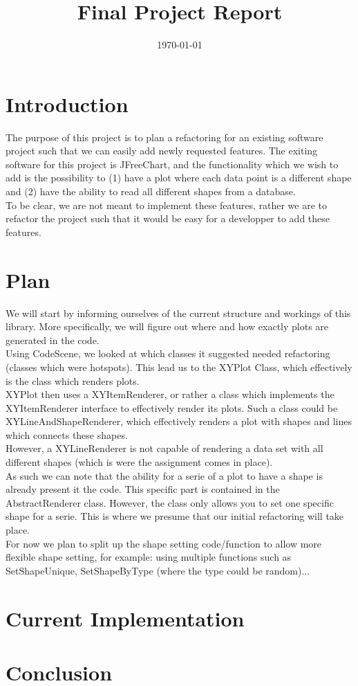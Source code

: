 \documentclass{article}
\title{\textmd{\textbf{Final Project Report}}\\\normalsize\vspace{0.1in}\Large{\projectnaam}}
\author{\student}\date{\today}
\begin{document}
\maketitle
\newpage

\section{Introduction}

The purpose of this project is to plan a refactoring for an existing software project such that we can easily add newly requested features.
The exiting software for this project is JFreeChart, and the functionality which we wish to add is the possibility to (1) have a plot where each data point is a different shape and (2) have the ability to read all different shapes from a database.\\

To be clear, we are not meant to implement these features, rather we are to refactor the project such that it would be easy for a developper to add these features.

\section{Plan}

We will start by informing ourselves of the current structure and workings of this library. More specifically, we will figure out where and how exactly plots are generated in the code.\\

Using CodeScene, we looked at which classes it suggested needed refactoring (classes which were hotspots). This lead us to the XYPlot Class, which effectively is the class which renders plots.\\

XYPlot then uses a XYItemRenderer, or rather a class which implements the XYItemRenderer interface to effectively render its plots. Such a class could be XYLineAndShapeRenderer, which effectively renders a plot with shapes and lines which connects these shapes.\\

However, a XYLineRenderer is not capable of rendering a data set with all different shapes (which is were the assignment comes in place).\\

As such we can note that the ability for a serie of a plot to have a shape is already present it the code. This specific part is contained in the AbstractRenderer class. However, the class only allows you to set one specific shape for a serie. This is where we presume that our initial refactoring will take place.\\

For now we plan to split up the shape setting code/function to allow more flexible shape setting, for example: using multiple functions such as SetShapeUnique, SetShapeByType (where the type could be random)...


\section{Current Implementation}


\newpage
\section{Conclusion}
\end{document}
